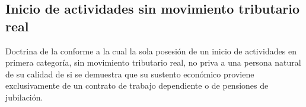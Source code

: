 \subsection{Inicio de actividades sin movimiento tributario real}

Doctrina de la  conforme a la cual la sola posesión de un inicio de
actividades en primera categoría, sin movimiento tributario real, no priva a una persona
natural de su calidad de \personadeudora{} si se demuestra que su sustento económico
proviene exclusivamente de un contrato de trabajo dependiente o de pensiones de
jubilación.
